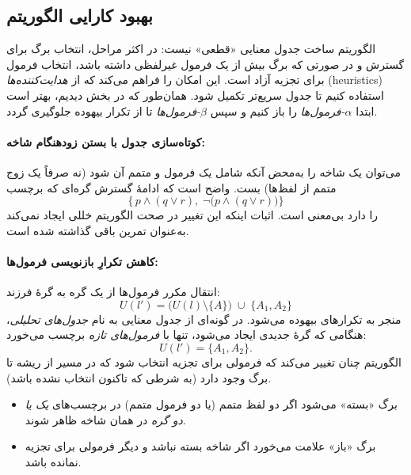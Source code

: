 \subsection*{ بهبود کارایی الگوریتم}
  الگوریتم ساخت جدول معنایی «قطعی» نیست: در اکثر مراحل، انتخاب برگ برای گسترش و در صورتی که برگ بیش از یک فرمول غیرلفظی داشته باشد، انتخاب فرمول برای تجزیه آزاد است. این امکان را فراهم می‌کند که از \emph{هدایت‌کننده‌ها} (heuristics) استفاده کنیم تا جدول سریع‌تر تکمیل شود. همان‌طور که در بخش  دیدیم، بهتر است ابتدا \emph{$\alpha$-فرمول‌ها} را باز کنیم و سپس \emph{$\beta$-فرمول‌ها} تا از تکرار بیهوده جلوگیری گردد.
  
  \paragraph{کوتاه‌سازی جدول با بستن زودهنگام شاخه: }
  می‌توان یک شاخه را به‌محض آنکه شامل یک فرمول و متمم آن شود (نه صرفاً یک زوج متمم از لفظ‌ها) بست. واضح است که ادامهٔ گسترش گره‌ای که برچسب
  \[
  \{\,p \land (q \lor r),\;\neg\bigl(p \land (q \lor r)\bigr)\}
  \]
  را دارد بی‌معنی است. اثبات اینکه این تغییر در صحت الگوریتم خللی ایجاد نمی‌کند به‌عنوان تمرین باقی گذاشته شده است.
  
  \paragraph{کاهش تکرارِ بازنویسی فرمول‌ها: }
  انتقال مکرر فرمول‌ها از یک گره به گرهٔ فرزند:
  \[
  U(l') = \bigl(U(l)\setminus\{A\}\bigr)\;\cup\;\{A_1,A_2\}
  \]
  منجر به تکرارهای بیهوده می‌شود. در گونه‌ای از جدول معنایی به نام \emph{جدول‌های تحلیلی}، هنگامی که گرهٔ جدیدی ایجاد می‌شود، تنها با \emph{فرمول‌های تازه} برچسب می‌خورد:
  \[
  U(l') = \{A_1, A_2\}.
  \]
  الگوریتم چنان تغییر می‌کند که فرمولی برای تجزیه انتخاب شود که در مسیر از ریشه تا برگ وجود دارد (به شرطی که تاکنون انتخاب نشده باشد).
  
  \begin{itemize}
    \item برگ «بسته» می‌شود اگر دو لفظ متمم (یا دو فرمول متمم) در برچسب‌های \emph{یک یا دو گره} در همان شاخه ظاهر شوند.
    \item برگ «باز» علامت می‌خورد اگر شاخه بسته نباشد و دیگر فرمولی برای تجزیه نمانده باشد.
  \end{itemize}
  
